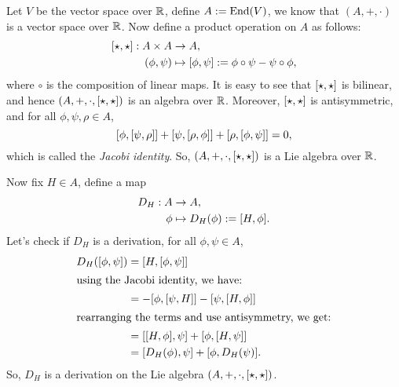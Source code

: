 \begin{example}
    Let \(V\) be the vector space over \(\mathbb R\), define \(A := \operatorname{End}(V)\), we know that \((A, +, \cdot)\) is a vector space over \(\mathbb R\). Now define a product operation on \(A\) as follows:
    \begin{equation}
        \begin{aligned}
            \comm{\star}{\star}: A \times A & \to A,                                                          \\
            (\phi, \psi)                    & \mapsto \comm{\phi}{\psi} := \phi \circ \psi - \psi \circ \phi,
        \end{aligned}
    \end{equation}
    where \(\circ\) is the composition of linear maps. It is easy to see that \(\comm{\star}{\star}\) is bilinear, and hence \((A, +, \cdot, \comm{\star}{\star})\) is an algebra over \(\mathbb R\).
    Moreover, \(\comm{\star}{\star}\) is antisymmetric, and for all \(\phi, \psi, \rho \in A\),
    \begin{equation}
        \comm{\phi}{\comm{\psi}{\rho}} + \comm{\psi}{\comm{\rho}{\phi}} + \comm{\rho}{\comm{\phi}{\psi}} = 0,
    \end{equation}
    which is called the \emph{Jacobi identity}. So, \((A, +, \cdot, \comm{\star}{\star})\) is a Lie algebra over \(\mathbb R\).

    Now fix \(H \in A\), define a map
    \begin{equation}
        \begin{aligned}
            D_H : A & \to A,                               \\
            \phi    & \mapsto D_H(\phi) := \comm{H}{\phi}.
        \end{aligned}
    \end{equation}
    Let's check if \(D_H\) is a derivation, for all \(\phi, \psi \in A\),
    \begin{align*}
        D_H(\comm{\phi}{\psi}) & = \comm{H}{\comm{\phi}{\psi}}                                \\
        \shortintertext{using the Jacobi identity, we have:}
                               & = -\comm{\phi}{\comm{\psi}{H}} - \comm{\psi}{\comm{H}{\phi}} \\
        \shortintertext{rearranging the terms and use antisymmetry, we get:}
                               & = \comm{\comm{H}{\phi}}{\psi} + \comm{\phi}{\comm{H}{\psi}}  \\
                               & = \comm{D_H(\phi)}{\psi} + \comm{\phi}{D_H(\psi)}.
    \end{align*}
    So, \(D_H\) is a derivation on the Lie algebra \((A, +, \cdot, \comm{\star}{\star})\).
\end{example}
